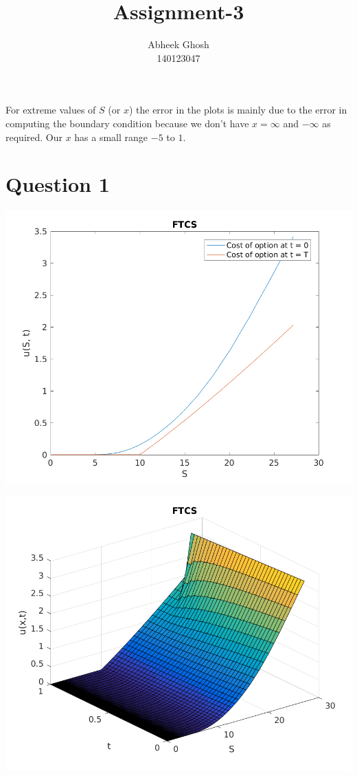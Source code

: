 \documentclass{article}
\begin{document}
	\title{\textbf{Assignment-3}}
	\author{Abheek Ghosh \\ 
		140123047 }
	
	\maketitle
	
For extreme values of $S$ (or $x$) the error in the plots is mainly due to the error in computing the boundary condition because we don't have $x = \infty$ and $-\infty$ as required. Our $x$ has a small range $-5$ to $1$.

\section{Question 1}

\includegraphics{"q1_1"}
\pagebreak


\includegraphics{"q1_2"}
\pagebreak
\end{document}
